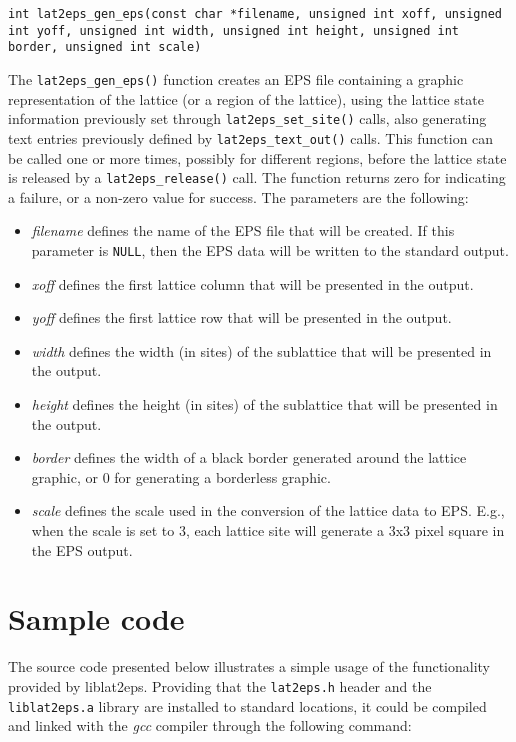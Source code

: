 \documentclass[a4paper]{article}
\begin{document}
\texttt{int lat2eps\_gen\_eps(const char *filename, unsigned int xoff, unsigned int yoff, unsigned int width, unsigned int height, unsigned int border, unsigned int scale)}
\bigbreak

The \texttt{lat2eps\_gen\_eps()} function creates an EPS file containing a graphic representation of the lattice (or a region of the lattice), using the lattice state information previously set through \texttt{lat2eps\_set\_site()} calls, also generating text entries previously defined by \texttt{lat2eps\_text\_out()} calls. This function can be called one or more times, possibly for different regions, before the lattice state is released by a \texttt{lat2eps\_release()} call. The function returns zero for indicating a failure, or a non-zero value for success. The parameters are the following:

\begin{itemize}
  \item \textit{filename} defines the name of the EPS file that will be created. If this parameter is \texttt{NULL}, then the EPS data will be written to the standard output.
  \item \textit{xoff} defines the first lattice column that will be presented in the output.
  \item \textit{yoff} defines the first lattice row that will be presented in the output.
  \item \textit{width} defines the width (in sites) of the sublattice that will be presented in the output.
  \item \textit{height} defines the height (in sites) of the sublattice that will be presented in the output.
  \item \textit{border} defines the width of a black border generated around the lattice graphic, or 0 for generating a borderless graphic.
  \item \textit{scale} defines the scale used in the conversion of the lattice data to EPS. E.g., when the scale is set to 3, each lattice site will generate a 3x3 pixel square in the EPS output.
\end{itemize} 
\bigbreak\bigbreak
\newpage

\section{Sample code}

The source code presented below illustrates a simple usage of the functionality provided by liblat2eps. Providing that the \texttt{lat2eps.h} header and the \texttt{liblat2eps.a} library are installed to standard locations, it could be compiled and linked with the \textit{gcc} compiler through the following command:
\bigbreak
\end{document}
